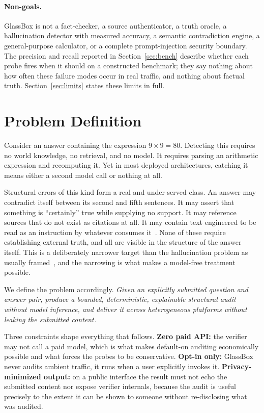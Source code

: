 \paragraph{Non-goals.}
GlassBox is not a fact-checker, a source authenticator, a truth oracle, a hallucination
detector with measured accuracy, a semantic contradiction engine, a general-purpose
calculator, or a complete prompt-injection security boundary. The precision and recall
reported in Section~\ref{sec:bench} describe whether each probe fires when it should on a
constructed benchmark; they say nothing about how often these failure modes occur in real
traffic, and nothing about factual truth. Section~\ref{sec:limits} states these limits in
full.

\section{Problem Definition}

Consider an answer containing the expression $9 \times 9 = 80$. Detecting this requires
no world knowledge, no retrieval, and no model. It requires parsing an arithmetic
expression and recomputing it. Yet in most deployed architectures, catching it means
either a second model call or nothing at all.

Structural errors of this kind form a real and under-served class. An answer may
contradict itself between its second and fifth sentences. It may assert that something is
``certainly'' true while supplying no support. It may reference sources that do not exist
as citations at all. It may contain text engineered to be read as an instruction by
whatever consumes it~\cite{greshake2023injection,perez2022ignore}. None of these require
establishing external truth, and all are visible in the structure of the answer itself.
This is a deliberately narrower target than the hallucination problem as usually
framed~\cite{ji2023survey,huang2023hallucination}, and the narrowing is what makes a
model-free treatment possible.

We define the problem accordingly. \emph{Given an explicitly submitted question and
answer pair, produce a bounded, deterministic, explainable structural audit without model
inference, and deliver it across heterogeneous platforms without leaking the submitted
content.}

Three constraints shape everything that follows. \textbf{Zero paid API:} the verifier may
not call a paid model, which is what makes default-on auditing economically possible and
what forces the probes to be conservative. \textbf{Opt-in only:} GlassBox never audits
ambient traffic, it runs when a user explicitly invokes it. \textbf{Privacy-minimized
output:} on a public interface the result must not echo the submitted content nor expose
verifier internals, because the audit is useful precisely to the extent it can be shown
to someone without re-disclosing what was audited.

